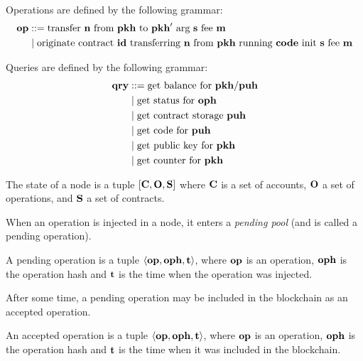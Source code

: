 \documentclass[a4paper]{llncs}
\begin{document}
\begin{definition}[Operation]
  Operations are defined by the following grammar:
  \begin{align*}
    \OP &::= \TRANSFER[\STRING]\NTEZ\PKH{\PKH'}\MTEZ
    \\&\mid \ORIGINATE\ID\NTEZ\PKH\CODE\STRING\MTEZ
  \end{align*}
\end{definition}

\begin{definition}[Query]
Queries are defined by the following grammar:
\begin{align*}
  \QRY & ::= \GETBALANCE {\PKH / \PUH}
  \\&\mid \GETSTATUS\OPH
  \\&\mid \GETSTORAGE\PUH
  \\&\mid \GETCODE\PUH 
  \\&\mid \GETPUBLICKEY\PKH
  \\&\mid \GETCOUNTER\PKH
\end{align*}


\end{definition}
 \begin{definition}
   The state of a node is a tuple
   $[\ACCOUNTS, \OPERATIONS, \CONTRACTS]$ where $\ACCOUNTS$ is a set of accounts,
   $\OPERATIONS$ a set of operations, and $\CONTRACTS$  a set of contracts. 
\end{definition}

When an operation is injected in a node, it enters a \emph{pending pool}
(and is called a pending operation). 
 \begin{definition}
A pending operation is a tuple  $\langle  \OP, \OPH, \TIME
\rangle $, where $\OP$ is an operation, $\OPH$ is the operation hash
and $\TIME$ is the time when the operation was injected. 
\end{definition}
After some time, a pending operation may be included in the blockchain as an accepted operation.
 \begin{definition}
An accepted operation  is a tuple $\langle  \OP, \OPH, \TIME \rangle
$, where $\OP$ is an operation, $\OPH$ is the operation hash and
$\TIME$ is the time when it was included in the blockchain. 
\end{definition}
\end{document}
